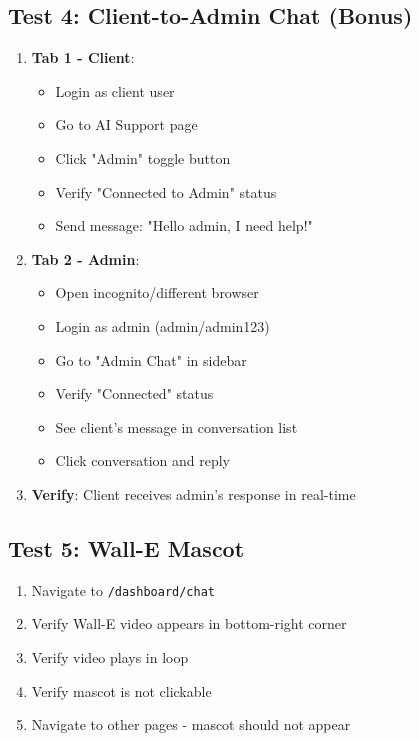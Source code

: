 \documentclass[12pt,a4paper]{article}
\begin{document}
\subsection{Test 4: Client-to-Admin Chat (Bonus)}
\begin{enumerate}
    \item \textbf{Tab 1 - Client}:
    \begin{itemize}
        \item Login as client user
        \item Go to AI Support page
        \item Click "Admin" toggle button
        \item Verify "Connected to Admin" status
        \item Send message: "Hello admin, I need help!"
    \end{itemize}
    \item \textbf{Tab 2 - Admin}:
    \begin{itemize}
        \item Open incognito/different browser
        \item Login as admin (admin/admin123)
        \item Go to "Admin Chat" in sidebar
        \item Verify "Connected" status
        \item See client's message in conversation list
        \item Click conversation and reply
    \end{itemize}
    \item \textbf{Verify}: Client receives admin's response in real-time
\end{enumerate}

\subsection{Test 5: Wall-E Mascot}
\begin{enumerate}
    \item Navigate to \texttt{/dashboard/chat}
    \item Verify Wall-E video appears in bottom-right corner
    \item Verify video plays in loop
    \item Verify mascot is not clickable
    \item Navigate to other pages - mascot should not appear
\end{enumerate}

\end{document}
